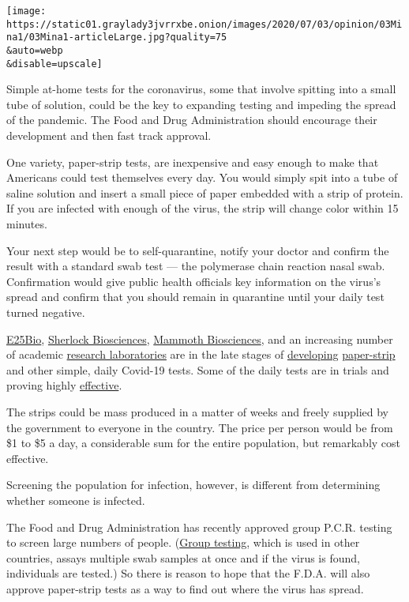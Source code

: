 \texttt{[image: https://static01.graylady3jvrrxbe.onion/images/2020/07/03/opinion/03Mina1/03Mina1-articleLarge.jpg?quality=75\\\&auto=webp\\\&disable=upscale]}

Simple at-home tests for the coronavirus, some that involve spitting
into a small tube of solution, could be the key to expanding testing and
impeding the spread of the pandemic. The Food and Drug Administration
should encourage their development and then fast track approval.

One variety, paper-strip tests, are inexpensive and easy enough to make
that Americans could test themselves every day. You would simply spit
into a tube of saline solution and insert a small piece of paper
embedded with a strip of protein. If you are infected with enough of the
virus, the strip will change color within 15 minutes.

Your next step would be to self-quarantine, notify your doctor and
confirm the result with a standard swab test --- the polymerase chain
reaction nasal swab. Confirmation would give public health officials key
information on the virus's spread and confirm that you should remain in
quarantine until your daily test turned negative.

\href{https://e25bio.com/}{E25Bio},
\href{https://sherlock.bio/technology/}{Sherlock Biosciences},
\href{https://mammoth.bio/}{Mammoth Biosciences}, and an increasing
number of academic
\href{http://news.mit.edu/2020/sherlock-based-one-step-test-provides-rapid-sensitive-covid-19-detection-0505}{research
laboratories} are in the late stages of
\href{https://sciencebusiness.technewslit.com/?p=36279}{developing}
\href{https://e25bio.com/products/}{paper-strip} and other simple, daily
Covid-19 tests. Some of the daily tests are in trials and proving highly
\href{https://www.nature.com/articles/s41587-020-0513-4}{effective}.

The strips could be mass produced in a matter of weeks and freely
supplied by the government to everyone in the country. The price per
person would be from \$1 to \$5 a day, a considerable sum for the entire
population, but remarkably cost effective.

Screening the population for infection, however, is different from
determining whether someone is infected.

The Food and Drug Administration has recently approved group P.C.R.
testing to screen large numbers of people.
(\href{https://www.nytimes3xbfgragh.onion/2020/05/07/opinion/coronavirus-group-testing.html}{Group
testing}, which is used in other countries, assays multiple swab samples
at once and if the virus is found, individuals are tested.) So there is
reason to hope that the F.D.A. will also approve paper-strip tests as a
way to find out where the virus has spread.

